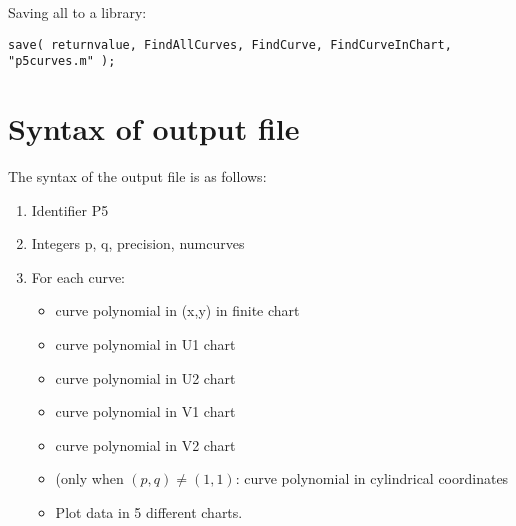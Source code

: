 \documentclass[a4paper,10pt]{article}
\begin{document}
Saving all to a library:

\begin{lstlisting}[name=p5curves]
save( returnvalue, FindAllCurves, FindCurve, FindCurveInChart, "p5curves.m" );
\end{lstlisting}

\section{Syntax of output file}

The syntax of the output file is as follows:

\begin{enumerate}
\item
    Identifier P5
\item
    Integers p, q, precision, numcurves
\item
    For each curve:
    \begin{itemize}
    \item
        curve polynomial in (x,y) in finite chart
    \item
        curve polynomial in U1 chart
    \item
        curve polynomial in U2 chart
    \item
        curve polynomial in V1 chart
    \item
        curve polynomial in V2 chart
    \item
        (only when $(p,q)\not=(1,1)$: curve polynomial in cylindrical coordinates
    \item
        Plot data in 5 different charts.
    \end{itemize}
\end{enumerate}
\end{document}
